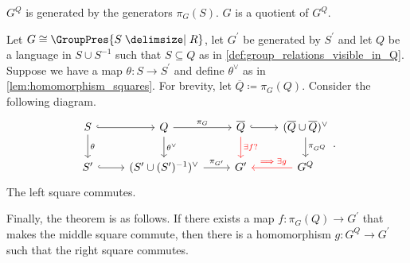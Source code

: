 \begin{remark}
	$G^Q$ is generated by the generators $\pi_G(S)$.  $G$ is a quotient of  $G^Q$.
\end{remark}

\begin{theorem}
	Let $G \cong \GroupPres{S \relations R}$, let  $G^\prime$ be generated by $S^\prime$ and let $Q$ be a language in  $S \cup S^{-1}$ such that $S \subseteq Q$ as in \cref{def:group_relations_visible_in_Q}.
	Suppose we have a map $\theta \colon S \to S^\prime$ and define $\theta^\vee$ as in \cref{lem:homomorphism_squares}.
	For brevity, let $\overline{Q} \coloneqq \pi_G(Q)$.
	Consider the following diagram.
	\[
		\begin{tikzcd}
			S \ar[d, "\theta"] \ar[r, hook] & Q \ar[d, "\theta^\vee"] \ar[r, "\pi_G"] & \overline{Q} \ar[d, color=red, "\exists f ?"] \ar[r, hook] & (\overline{Q} \cup \overline{Q})^\vee \ar[d, "\pi_{G^Q}"]\\
			S^\prime \ar[r, hook] & (S^\prime \cup (S^\prime)^{-1})^\vee \ar[r, "\pi_{G^\prime}"] & G^\prime & G^Q \ar[l, color=red, "\implies \exists g"']
		\end{tikzcd}
		.\]
	The left square commutes.

	Finally, the theorem is as follows.
	If there exists a map $f \colon \pi_G(Q) \to G^\prime$ that makes the middle square commute, then there is a homomorphism $g \colon G^Q \to G^\prime$ such that the right square commutes.
	\label{thm:commuting_diagram_GQ}
\end{theorem}
